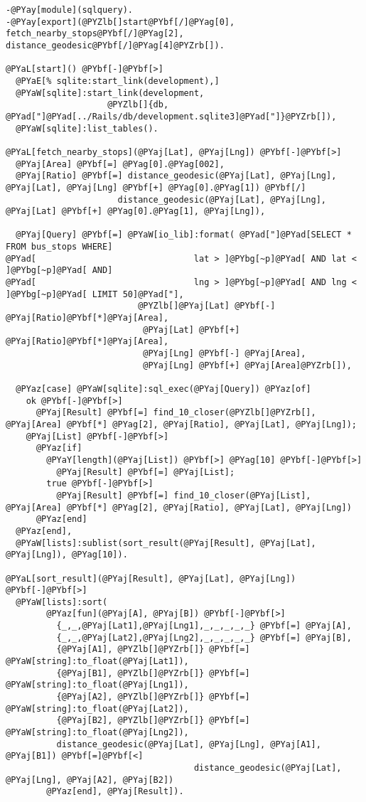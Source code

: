 \begin{Verbatim}[commandchars=@\[\]]
-@PYay[module](sqlquery).
-@PYay[export](@PYZlb[]start@PYbf[/]@PYag[0], fetch_nearby_stops@PYbf[/]@PYag[2], distance_geodesic@PYbf[/]@PYag[4]@PYZrb[]).

@PYaL[start]() @PYbf[-]@PYbf[>]
  @PYaE[% sqlite:start_link(development),]
  @PYaW[sqlite]:start_link(development,
                    @PYZlb[]{db, @PYad["]@PYad[../Rails/db/development.sqlite3]@PYad["]}@PYZrb[]),
  @PYaW[sqlite]:list_tables().
  
@PYaL[fetch_nearby_stops](@PYaj[Lat], @PYaj[Lng]) @PYbf[-]@PYbf[>]
  @PYaj[Area] @PYbf[=] @PYag[0].@PYag[002],
  @PYaj[Ratio] @PYbf[=] distance_geodesic(@PYaj[Lat], @PYaj[Lng], @PYaj[Lat], @PYaj[Lng] @PYbf[+] @PYag[0].@PYag[1]) @PYbf[/]
                      distance_geodesic(@PYaj[Lat], @PYaj[Lng], @PYaj[Lat] @PYbf[+] @PYag[0].@PYag[1], @PYaj[Lng]),

  @PYaj[Query] @PYbf[=] @PYaW[io_lib]:format( @PYad["]@PYad[SELECT * FROM bus_stops WHERE]
@PYad[                               lat > ]@PYbg[~p]@PYad[ AND lat < ]@PYbg[~p]@PYad[ AND]
@PYad[                               lng > ]@PYbg[~p]@PYad[ AND lng < ]@PYbg[~p]@PYad[ LIMIT 50]@PYad["],
                          @PYZlb[]@PYaj[Lat] @PYbf[-] @PYaj[Ratio]@PYbf[*]@PYaj[Area],
                           @PYaj[Lat] @PYbf[+] @PYaj[Ratio]@PYbf[*]@PYaj[Area], 
                           @PYaj[Lng] @PYbf[-] @PYaj[Area],
                           @PYaj[Lng] @PYbf[+] @PYaj[Area]@PYZrb[]),

  @PYaz[case] @PYaW[sqlite]:sql_exec(@PYaj[Query]) @PYaz[of]
    ok @PYbf[-]@PYbf[>]
      @PYaj[Result] @PYbf[=] find_10_closer(@PYZlb[]@PYZrb[], @PYaj[Area] @PYbf[*] @PYag[2], @PYaj[Ratio], @PYaj[Lat], @PYaj[Lng]);
    @PYaj[List] @PYbf[-]@PYbf[>]
      @PYaz[if]
        @PYaY[length](@PYaj[List]) @PYbf[>] @PYag[10] @PYbf[-]@PYbf[>]
          @PYaj[Result] @PYbf[=] @PYaj[List];
        true @PYbf[-]@PYbf[>]
          @PYaj[Result] @PYbf[=] find_10_closer(@PYaj[List], @PYaj[Area] @PYbf[*] @PYag[2], @PYaj[Ratio], @PYaj[Lat], @PYaj[Lng])
      @PYaz[end]
  @PYaz[end],
  @PYaW[lists]:sublist(sort_result(@PYaj[Result], @PYaj[Lat], @PYaj[Lng]), @PYag[10]).

@PYaL[sort_result](@PYaj[Result], @PYaj[Lat], @PYaj[Lng]) @PYbf[-]@PYbf[>]
  @PYaW[lists]:sort(
        @PYaz[fun](@PYaj[A], @PYaj[B]) @PYbf[-]@PYbf[>]
          {_,_,@PYaj[Lat1],@PYaj[Lng1],_,_,_,_,_} @PYbf[=] @PYaj[A],
          {_,_,@PYaj[Lat2],@PYaj[Lng2],_,_,_,_,_} @PYbf[=] @PYaj[B],
          {@PYaj[A1], @PYZlb[]@PYZrb[]} @PYbf[=] @PYaW[string]:to_float(@PYaj[Lat1]),
          {@PYaj[B1], @PYZlb[]@PYZrb[]} @PYbf[=] @PYaW[string]:to_float(@PYaj[Lng1]),
          {@PYaj[A2], @PYZlb[]@PYZrb[]} @PYbf[=] @PYaW[string]:to_float(@PYaj[Lat2]),
          {@PYaj[B2], @PYZlb[]@PYZrb[]} @PYbf[=] @PYaW[string]:to_float(@PYaj[Lng2]),
          distance_geodesic(@PYaj[Lat], @PYaj[Lng], @PYaj[A1], @PYaj[B1]) @PYbf[=]@PYbf[<]
                                     distance_geodesic(@PYaj[Lat], @PYaj[Lng], @PYaj[A2], @PYaj[B2])
        @PYaz[end], @PYaj[Result]).


\end{Verbatim}
